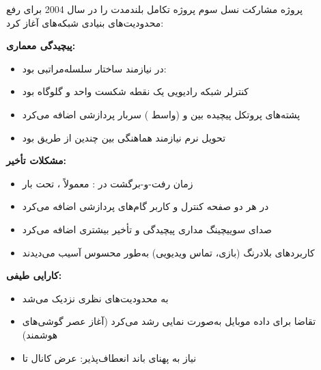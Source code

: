 

\CNchained{}

پروژه مشارکت نسل سوم  پروژه تکامل بلندمدت  را در سال 2004 برای رفع محدودیت‌های بنیادی شبکه‌های  آغاز کرد:

\textbf{پیچیدگی معماری:}

\begin{itemize}
\tightlist
\item
   در  نیازمند ساختار سلسله‌مراتبی بود: 
\item
  کنترلر شبکه رادیویی  یک نقطه شکست واحد و گلوگاه بود
\item
  پشته‌های پروتکل پیچیده بین  و  (واسط ) سربار پردازشی اضافه می‌کرد
\item
  تحویل نرم نیازمند هماهنگی بین چندین  از طریق  بود
\end{itemize}

\textbf{مشکلات تأخیر:}

\begin{itemize}
\tightlist
\item
  زمان رفت-و-برگشت  در : معمولاً ، تحت بار 
\item
   در هر دو صفحه کنترل و کاربر گام‌های پردازشی اضافه می‌کرد
\item
  صدای سوییچینگ مداری پیچیدگی و تأخیر بیشتری اضافه می‌کرد
\item
  کاربردهای بلادرنگ (بازی، تماس ویدیویی) به‌طور محسوس آسیب می‌دیدند
\end{itemize}

\textbf{کارایی طیفی:}

\begin{itemize}
\tightlist
\item
   به محدودیت‌های نظری نزدیک می‌شد
\item
  تقاضا برای داده موبایل به‌صورت نمایی رشد می‌کرد (آغاز عصر گوشی‌های هوشمند)
\item
  نیاز به پهنای باند انعطاف‌پذیر: عرض کانال  تا 
\end{itemize}

